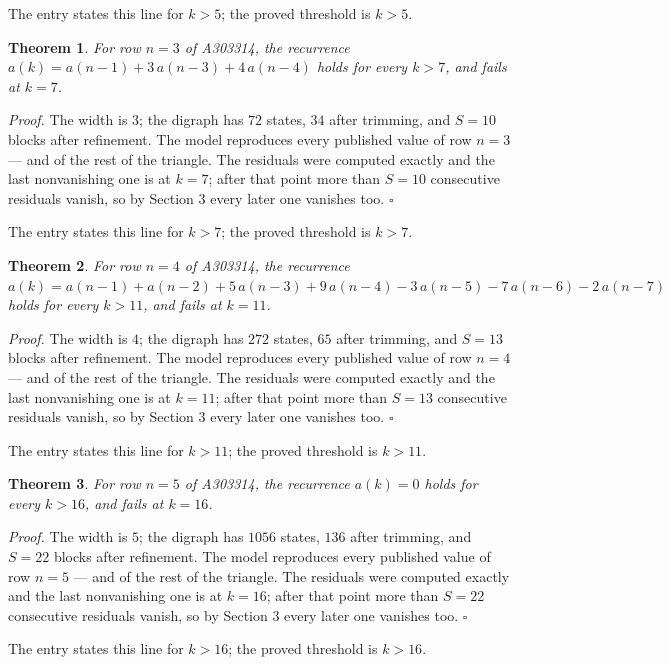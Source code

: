 \documentclass[11pt]{article}
\newtheorem{theorem}{Theorem}
\theoremstyle{definition}
\begin{document}
The entry states this line for $k > 5$; the proved threshold is $k > 5$.

\begin{theorem} For row $n = 3$ of A303314, the recurrence $a(k) = a(n-1) + 3\,a(n-3) + 4\,a(n-4)$ holds for every $k > 7$, and fails at $k = 7$.\end{theorem}

{\itshape Proof.} The width is $3$; the digraph has $72$ states, $34$ after trimming, and $S = 10$ blocks after refinement. The model reproduces every published value of row $n = 3$ --- and of the rest of the triangle. The residuals were computed exactly and the last nonvanishing one is at $k = 7$; after that point more than $S = 10$ consecutive residuals vanish, so by Section 3 every later one vanishes too. $\square$

The entry states this line for $k > 7$; the proved threshold is $k > 7$.

\begin{theorem} For row $n = 4$ of A303314, the recurrence $a(k) = a(n-1) + a(n-2) + 5\,a(n-3) + 9\,a(n-4) - 3\,a(n-5) - 7\,a(n-6) - 2\,a(n-7)$ holds for every $k > 11$, and fails at $k = 11$.\end{theorem}

{\itshape Proof.} The width is $4$; the digraph has $272$ states, $65$ after trimming, and $S = 13$ blocks after refinement. The model reproduces every published value of row $n = 4$ --- and of the rest of the triangle. The residuals were computed exactly and the last nonvanishing one is at $k = 11$; after that point more than $S = 13$ consecutive residuals vanish, so by Section 3 every later one vanishes too. $\square$

The entry states this line for $k > 11$; the proved threshold is $k > 11$.

\begin{theorem} For row $n = 5$ of A303314, the recurrence $a(k) = 0$ holds for every $k > 16$, and fails at $k = 16$.\end{theorem}

{\itshape Proof.} The width is $5$; the digraph has $1056$ states, $136$ after trimming, and $S = 22$ blocks after refinement. The model reproduces every published value of row $n = 5$ --- and of the rest of the triangle. The residuals were computed exactly and the last nonvanishing one is at $k = 16$; after that point more than $S = 22$ consecutive residuals vanish, so by Section 3 every later one vanishes too. $\square$

The entry states this line for $k > 16$; the proved threshold is $k > 16$.
\end{document}
